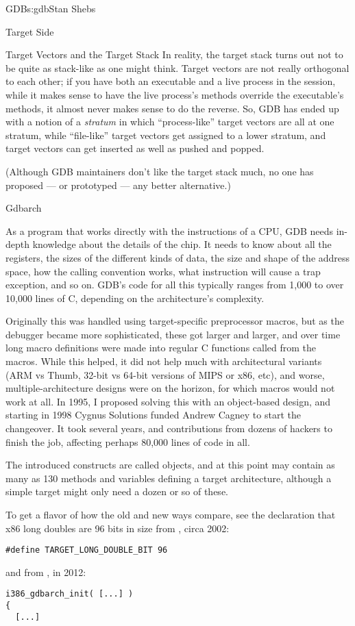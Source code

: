 \begin{aosachapter}{GDB}{s:gdb}{Stan Shebs}
\begin{aosasect1}{Target Side}
\begin{aosasect2}{Target Vectors and the Target Stack}
In reality, the target stack turns out not to be quite as stack-like
as one might think.  Target vectors are not really orthogonal to each
other; if you have both an executable and a live process in the
session, while it makes sense to have the live process's methods
override the executable's methods, it almost never makes sense to do
the reverse.  So, GDB has ended up with a notion of a {\em stratum} in
which ``process-like'' target vectors are all at one stratum, while
``file-like'' target vectors get assigned to a lower stratum, and
target vectors can get inserted as well as pushed and popped.

(Although GDB maintainers don't like the target stack much, no one has
proposed --- or prototyped --- any better alternative.)

\end{aosasect2}

\begin{aosasect2}{Gdbarch}

As a program that works directly with the instructions of a CPU, GDB
needs in-depth knowledge about the details of the chip.  It needs to
know about all the registers, the sizes of the different kinds of
data, the size and shape of the address space, how the calling
convention works, what instruction will cause a trap exception, and so
on.  GDB's code for all this typically ranges from 1,000 to over
10,000 lines of C, depending on the architecture's complexity.

Originally this was handled using target-specific preprocessor macros,
but as the debugger became more sophisticated, these got larger and
larger, and over time long macro definitions were made into regular C
functions called from the macros.  While this helped, it did not help
much with architectural variants (ARM vs Thumb, 32-bit vs 64-bit
versions of MIPS or x86, etc), and worse, multiple-architecture
designs were on the horizon, for which macros would not work at all.
In 1995, I proposed solving this with an object-based design, and
starting in 1998 Cygnus Solutions funded Andrew Cagney to start the
changeover.  It took several years, and contributions from dozens of
hackers to finish the job, affecting perhaps 80,000 lines of code in
all.

The introduced constructs are called  objects, and at
this point may contain as many as 130 methods and variables defining a
target architecture, although a simple target might only need a dozen
or so of these.

To get a flavor of how the old and new ways compare, see the
declaration that x86 long doubles are 96 bits in size from
, circa 2002:
\begin{verbatim}
#define TARGET_LONG_DOUBLE_BIT 96
\end{verbatim}
and from , in 2012:
\begin{verbatim}
i386_gdbarch_init( [...] )
{
  [...]


\end{verbatim}
\end{aosasect2}
\end{aosasect1}
\end{aosachapter}
